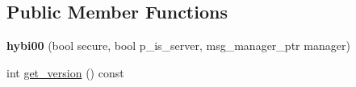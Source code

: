 \subsection*{Public Member Functions}
\begin{DoxyCompactItemize}
\item 
{\bfseries hybi00} (bool secure, bool p\+\_\+is\+\_\+server, msg\+\_\+manager\+\_\+ptr manager)\hypertarget{classwebsocketpp_1_1processor_1_1hybi00_ac9e56c69bfab35accfa60867d49c90f5}{}\label{classwebsocketpp_1_1processor_1_1hybi00_ac9e56c69bfab35accfa60867d49c90f5}

\item 
int \hyperlink{classwebsocketpp_1_1processor_1_1hybi00_a9e3f451bd48b1072a377108eba0cf0f5}{get\+\_\+version} () const\hypertarget{classwebsocketpp_1_1processor_1_1hybi00_a9e3f451bd48b1072a377108eba0cf0f5}{}\label{classwebsocketpp_1_1processor_1_1hybi00_a9e3f451bd48b1072a377108eba0cf0f5}


\end{DoxyCompactItemize}
